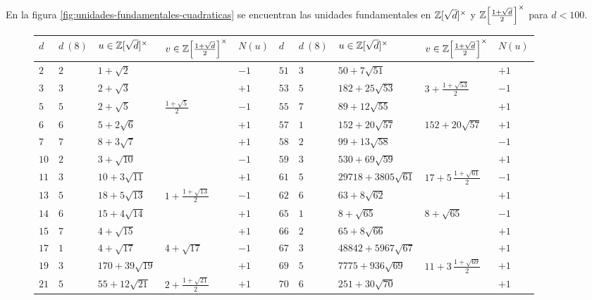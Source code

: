 En la figura \ref{fig:unidades-fundamentales-cuadraticas} se encuentran las
unidades fundamentales en $\mathbb{Z} [\sqrt{d}]^\times$ y
$\mathbb{Z} \Bigl[\frac{1+\sqrt{d}}{2}\Bigr]^\times$ para $d < 100$.

\begin{figure}
  \begin{center}\def\arraystretch{1.65}\small
    \begin{tabular}{M{0.3cm}M{0.4cm}M{2.5cm}M{2.1cm}M{0.7cm}|M{0.3cm}M{0.4cm}M{3.3cm}M{2.4cm}M{0.7cm}}
      \hline
      $d$ & $d~(8)$ & $u \in \mathbb{Z} [\sqrt{d}]^\times$ & $v \in \mathbb{Z} \Bigl[\frac{1+\sqrt{d}}{2}\Bigr]^\times$ & $N (u)$ & $d$ & $d~(8)$ & $u \in \mathbb{Z} [\sqrt{d}]^\times$ & $v \in \mathbb{Z} \Bigl[\frac{1+\sqrt{d}}{2}\Bigr]^\times$ & $N (u)$ \\
      \hline
      $2$ & $2$ & $1 + \sqrt{2}$ & & $-1$ & $51$ & $3$ & $50 + 7\sqrt{51}$ & & $+1$ \\
      $3$ & $3$ & $2 + \sqrt{3}$ & & $+1$ & $53$ & $5$ & $182 + 25\sqrt{53}$ & $3 + \frac{1+\sqrt{53}}{2}$ & $-1$ \\
      $5$ & $5$ & $2 + \sqrt{5}$ & $\frac{1+\sqrt{5}}{2}$ & $-1$ & $55$ & $7$ & $89 + 12\sqrt{55}$ & & $+1$ \\
      $6$ & $6$ & $5 + 2\sqrt{6}$ & & $+1$ & $57$ & $1$ & $152 + 20\sqrt{57}$ & $152 + 20\sqrt{57}$ & $+1$ \\
      $7$ & $7$ & $8 + 3\sqrt{7}$ & & $+1$ & $58$ & $2$ & $99 + 13\sqrt{58}$ & & $-1$ \\
      $10$ & $2$ & $3 + \sqrt{10}$ & & $-1$ & $59$ & $3$ & $530 + 69\sqrt{59}$ & & $+1$ \\
      $11$ & $3$ & $10 + 3\sqrt{11}$ & & $+1$ & $61$ & $5$ & $29718 + 3805\sqrt{61}$ & $17 + 5\,\frac{1+\sqrt{61}}{2}$ & $-1$ \\
      $13$ & $5$ & $18 + 5\sqrt{13}$ & $1 + \frac{1+\sqrt{13}}{2}$ & $-1$ & $62$ & $6$ & $63 + 8\sqrt{62}$ & & $+1$ \\
      $14$ & $6$ & $15 + 4\sqrt{14}$ & & $+1$ & $65$ & $1$ & $8 + \sqrt{65}$ & $8 + \sqrt{65}$ & $-1$ \\
      $15$ & $7$ & $4 + \sqrt{15}$ & & $+1$ & $66$ & $2$ & $65 + 8\sqrt{66}$ & & $+1$ \\
      $17$ & $1$ & $4 + \sqrt{17}$ & $4 + \sqrt{17}$ & $-1$ & $67$ & $3$ & $48842 + 5967\sqrt{67}$ & & $+1$ \\
      $19$ & $3$ & $170 + 39\sqrt{19}$ & & $+1$ & $69$ & $5$ & $7775 + 936\sqrt{69}$ & $11 + 3\,\frac{1+\sqrt{69}}{2}$ & $+1$ \\
      $21$ & $5$ & $55 + 12\sqrt{21}$ & $2 + \frac{1+\sqrt{21}}{2}$ & $+1$ & $70$ & $6$ & $251 + 30\sqrt{70}$ & & $+1$ \\

\end{tabular}
\end{center}
\end{figure}
